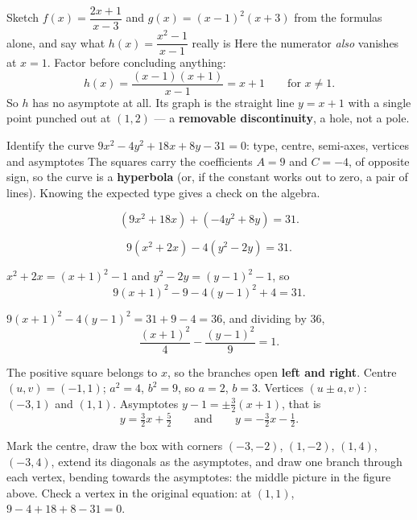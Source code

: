 \begin{worked}{Sketch $f(x)=\dfrac{2x+1}{x-3}$ and $g(x)=(x-1)^{2}(x+3)$ from the formulas alone, and say what $h(x)=\dfrac{x^{2}-1}{x-1}$ really is}
Here the numerator \emph{also} vanishes at $x=1$. Factor before concluding
anything:
\[
  h(x)=\frac{(x-1)(x+1)}{x-1}=x+1\qquad\text{for }x\neq1 .
\]
So $h$ has no asymptote at all. Its graph is the straight line $y=x+1$ with a
single point punched out at $(1,2)$ --- a \textbf{removable discontinuity},
a hole, not a pole.
\end{worked}

\begin{worked}{Identify the curve $9x^{2}-4y^{2}+18x+8y-31=0$: type, centre, semi-axes, vertices and asymptotes}
The squares carry the coefficients $A=9$ and $C=-4$, of opposite sign, so
the curve is a \textbf{hyperbola} (or, if the constant works out to zero, a
pair of lines). Knowing the expected type gives a check on the algebra.

\[
  (9x^{2}+18x)+(-4y^{2}+8y)=31 .
\]

\[
  9(x^{2}+2x)-4(y^{2}-2y)=31 .
\]

$x^{2}+2x=(x+1)^{2}-1$ and $y^{2}-2y=(y-1)^{2}-1$, so
\[
  9(x+1)^{2}-9-4(y-1)^{2}+4=31 .
\]

$9(x+1)^{2}-4(y-1)^{2}=31+9-4=36$, and dividing by $36$,
\[
  \boxed{\frac{(x+1)^{2}}{4}-\frac{(y-1)^{2}}{9}=1 .}
\]

The positive square belongs to $x$, so the branches open \textbf{left and
right}. Centre $(u,v)=(-1,1)$; $a^{2}=4$, $b^{2}=9$, so $a=2$, $b=3$.
Vertices $(u\pm a,v)$: $(-3,1)$ and $(1,1)$. Asymptotes
$y-1=\pm\tfrac32(x+1)$, that is
\[
  y=\tfrac32x+\tfrac52\qquad\text{and}\qquad y=-\tfrac32x-\tfrac12 .
\]

Mark the centre, draw the box with corners $(-3,-2)$, $(1,-2)$, $(1,4)$,
$(-3,4)$, extend its diagonals as the asymptotes, and draw one branch
through each vertex, bending towards the asymptotes: the middle picture
in the figure above. Check a vertex in the original equation: at $(1,1)$,
$9-4+18+8-31=0$. \checkmark
\end{worked}


